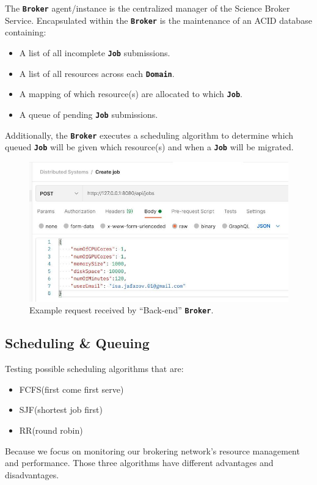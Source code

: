 \documentclass{ReportCUNY}
\newcommand{\KeyWord}[1]{\textbf{\texttt{#1}}}
\begin{document}
The \KeyWord{Broker} agent/instance is the centralized manager of the Science Broker Service.
Encapsulated within the \KeyWord{Broker} is the maintenance of an ACID database containing:
\begin{itemize}
\item A list of all incomplete \KeyWord{Job} submissions.
\item A list of all resources across each \KeyWord{Domain}.
\item A mapping of which resource(s) are allocated to which \KeyWord{Job}.
\item A queue of pending \KeyWord{Job} submissions.
\end{itemize}

Additionally, the \KeyWord{Broker} executes a scheduling algorithm to determine which queued \KeyWord{Job} will be given which resource(s) and when a \KeyWord{Job} will be migrated.

\begin{figure}
	\includegraphics[width=\textwidth]{Backend-API-Demo.jpeg}
	\caption{Example request received by ``Back-end''  \KeyWord{Broker}.}
\end{figure}


\subsection{Scheduling \& Queuing}

Testing possible scheduling algorithms that are:
\begin{itemize}
\item FCFS(first come first serve)
\item SJF(shortest job first)
\item RR(round robin)
\end{itemize}

Because we focus on monitoring our brokering network's resource management and performance. Those three algorithms have different advantages and disadvantages. 
\end{document}
